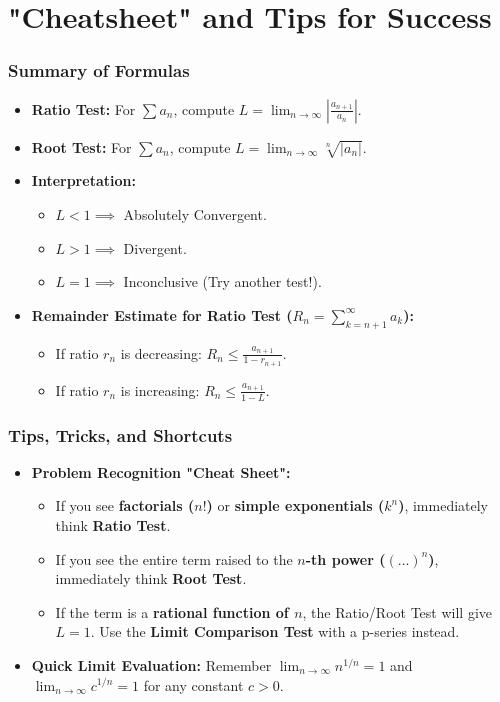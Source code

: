 \documentclass{article}
\begin{document}
\part{"Cheatsheet" and Tips for Success}
\section{Summary of Formulas}
\begin{itemize}
    \item \textbf{Ratio Test:} For $\sum a_n$, compute $L = \lim_{n \to \infty} |\frac{a_{n+1}}{a_n}|$.
    \item \textbf{Root Test:} For $\sum a_n$, compute $L = \lim_{n \to \infty} \sqrt[n]{|a_n|}$.
    \item \textbf{Interpretation:}
        \begin{itemize}
            \item $L < 1 \implies$ Absolutely Convergent.
            \item $L > 1 \implies$ Divergent.
            \item $L = 1 \implies$ Inconclusive (Try another test!).
        \end{itemize}
    \item \textbf{Remainder Estimate for Ratio Test ($R_n = \sum_{k=n+1}^\infty a_k$):}
        \begin{itemize}
            \item If ratio $r_n$ is decreasing: $R_n \le \frac{a_{n+1}}{1-r_{n+1}}$.
            \item If ratio $r_n$ is increasing: $R_n \le \frac{a_{n+1}}{1-L}$.
        \end{itemize}
\end{itemize}

\section{Tips, Tricks, and Shortcuts}
\begin{itemize}
    \item \textbf{Problem Recognition "Cheat Sheet":}
        \begin{itemize}
            \item If you see \textbf{factorials ($n!$)} or \textbf{simple exponentials ($k^n$)}, immediately think \textbf{Ratio Test}.
            \item If you see the entire term raised to the \textbf{$n$-th power ($(\dots)^n$)}, immediately think \textbf{Root Test}.
            \item If the term is a \textbf{rational function of $n$}, the Ratio/Root Test will give $L=1$. Use the \textbf{Limit Comparison Test} with a p-series instead.
        \end{itemize}
    \item \textbf{Quick Limit Evaluation:} Remember $\lim_{n \to \infty} n^{1/n} = 1$ and $\lim_{n \to \infty} c^{1/n} = 1$ for any constant $c>0$.
\end{itemize}
\end{document}
